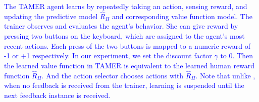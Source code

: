 \textcolor{blue}{The TAMER agent learns by repeatedly taking an action, sensing reward, and updating the predictive model $\hat{R}_{H}$ and corresponding value function model. The trainer observes and evaluates the agent's behavior. She can  give reward %
by pressing two buttons on the keyboard, which are assigned to the agent's most recent actions. Each press of the two buttons is mapped to a numeric reward of -1 or +1 respectively. In our experiment, we set the discount factor $\gamma$ to 0. Then the learned value function in TAMER is equivalent to the learned human reward function $\hat{R}_{H}$. 
And the action selector chooses actions with $\hat{R}_{H}$. Note that unlike \cite{knox2012learning}, when no feedback is received from the trainer, learning is suspended until the next feedback instance is received. %
}






